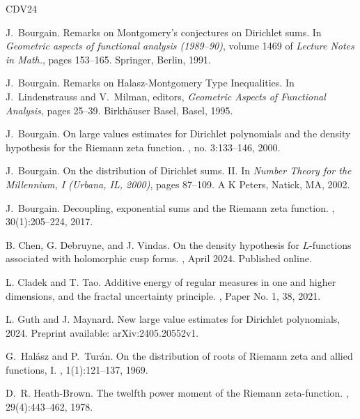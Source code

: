 \documentclass[a4paper, 10pt]{amsart}
\begin{document}
\begin{thebibliography}{CDV24}

J.~Bourgain.
\newblock Remarks on {M}ontgomery's conjectures on {D}irichlet sums.
\newblock In {\em Geometric aspects of functional analysis (1989--90)}, volume 1469 of {\em Lecture Notes in Math.}, pages 153--165. Springer, Berlin, 1991.

J.~Bourgain.
\newblock Remarks on {Halasz}-{Montgomery} {Type} {Inequalities}.
\newblock In J.~Lindenstrauss and V.~Milman, editors, {\em Geometric {Aspects} of {Functional} {Analysis}}, pages 25--39. Birkh\"{a}user Basel, Basel, 1995.

J.~Bourgain.
\newblock On large values estimates for Dirichlet polynomials and the density hypothesis for the Riemann zeta function.
, no. 3:133--146, 2000.

J.~Bourgain.
\newblock On the distribution of {D}irichlet sums. {II}.
\newblock In {\em Number Theory for the Millennium, {I} ({U}rbana, {IL}, 2000)}, pages 87--109. A K Peters, Natick, MA, 2002.

J.~Bourgain.
\newblock Decoupling, exponential sums and the {Riemann} zeta function.
, 30(1):205--224, 2017.

B. Chen, G. Debruyne, and J. Vindas.
\newblock On the density hypothesis for $L$-functions associated with holomorphic cusp forms.
, April 2024.
\newblock Published online.

L. Cladek and T. Tao.
\newblock Additive energy of regular measures in one and higher dimensions, and the fractal uncertainty principle.
, Paper No. 1, 38, 2021.

L. Guth and J. Maynard.
\newblock New large value estimates for Dirichlet polynomials, 2024.
\newblock Preprint available: arXiv:2405.20552v1.


G.~Hal\'{a}sz and P.~Tur\'{a}n.
\newblock On the distribution of roots of {Riemann} zeta and allied functions, {I}.
, 1(1):121--137, 1969.

D.~R. Heath-Brown.
\newblock The twelfth power moment of the Riemann zeta-function.
, 29(4):443--462, 1978.


\end{thebibliography}
\end{document}
